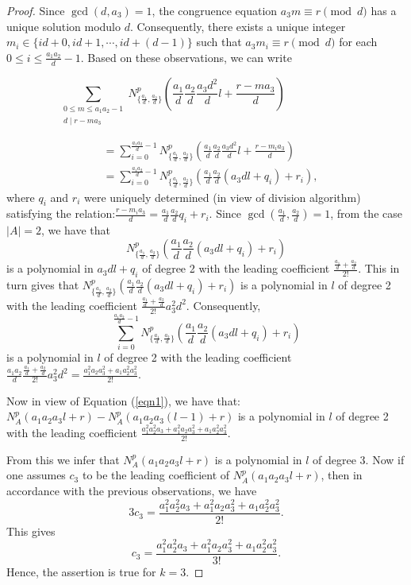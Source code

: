 \documentclass[10pt,a4paper]{amsart}
\begin{document}
\begin{proof}
Since $\gcd(d,a_3)=1$,  the congruence equation $a_3m\equiv r\pmod d$ has a unique solution modulo $d$. Consequently, there exists a unique integer   $m_i\in\{id+0,id+1,\cdots ,id+(d-1)\}$ such that $a_3m_i\equiv r\pmod d$ for each $0\leq i\leq\frac{a_1a_2}{d}-1$. Based on these observations, we can write

\[
\sum_{\substack{0\leq m\leq a_1a_2-1\\ d\mid r-ma_3}}N^p_{\{\frac{a_1}{d},\frac{a_2}{d}\}}\left(\frac{a_1}{d}\frac{a_2}{d}\frac{a_3d^2}{d}l+\frac{r-ma_3}{d}\right)\ \ \ \ \ \ \ \ \ \ \ \ \ \ \ \ \ \ \ \ \ \ \ \ \ \ \ \ 
\]


\begin{align*}
&=\sum_{i=0}^{\frac{a_1a_2}{d}-1}N^p_{\{\frac{a_1}{d},\frac{a_2}{d}\}}\left(\frac{a_1}{d}\frac{a_2}{d}\frac{a_3d^2}{d}l+\frac{r-m_ia_3}{d}\right)\\
&=\sum_{i=0}^{\frac{a_1a_2}{d}-1}N^p_{\{\frac{a_1}{d},\frac{a_2}{d}\}}\left(\frac{a_1}{d}\frac{a_2}{d}\left(a_3dl+q_i\right)+r_i\right),
\end{align*}
where $q_i$ and $r_i$ were uniquely determined (in view of division algorithm) satisfying the relation:$\frac{r-m_ia_3}{d}=\frac{a_1}{d}\frac{a_2}{d}q_i+r_i$. Since $\gcd(\frac{a_1}{d},\frac{a_2}{d})=1$, from the case $|A|=2$, we have that \[N^p_{\{\frac{a_1}{d},\frac{a_2}{d}\}}\left(\frac{a_1}{d}\frac{a_2}{d}\left(a_3dl+q_i\right)+r_i\right)\] is a polynomial in $a_3dl+q_i$ of degree 2 with the leading coefficient $\frac{\frac{a_1}{d}+\frac{a_2}{d}}{2!}$. This in turn gives that $N^p_{\{\frac{a_1}{d},\frac{a_2}{d}\}}\left(\frac{a_1}{d}\frac{a_2}{d}\left(a_3dl+q_i\right)+r_i\right)$ is a polynomial in $l$ of degree 2 with the leading coefficient $\frac{\frac{a_1}{d}+\frac{a_2}{d}}{2!}a_3^2d^2$. Consequently, \[\sum_{i=0}^{\frac{a_1a_2}{d}-1}N^p_{\{\frac{a_1}{d},\frac{a_2}{d}\}}\left(\frac{a_1}{d}\frac{a_2}{d}\left(a_3dl+q_i\right)+r_i\right)\] is a polynomial in $l$ of degree 2 with the leading coefficient 
$
\frac{a_1a_2}{d}\frac{\frac{a_1}{d}+\frac{a_2}{d}}{2!}a_3^2d^2
=\frac{a_1^2a_2a_3^2+a_1a_2^2a_3^2}{2!}$.

Now in view of Equation (\ref{eqn1}), we have that:
$
N_A^p(a_1a_2a_3l+r)-N_A^p(a_1a_2a_3(l-1)+r)
$ is a polynomial in $l$ of degree 2 with the leading coefficient $\frac{a_1^2a_2^2a_3+a_1^2a_2a_3^2+a_1a_2^2a_3^2}{2!}$.

From this we infer that $N_A^p(a_1a_2a_3l+r)$ is a polynomial in $l$ of degree 3. Now if one assumes $c_3$ to be the leading coefficient of $N_A^p(a_1a_2a_3l+r)$, then in accordance with the previous observations, we have
\[
3c_3=\frac{a_1^2a_2^2a_3+a_1^2a_2a_3^2+a_1a_2^2a_3^2}{2!}.
\]
This gives 
\[c_3=\frac{a_1^2a_2^2a_3+a_1^2a_2a_3^2+a_1a_2^2a_3^2}{3!}.
\]
Hence, the assertion is true for $k=3$. 


\end{proof}
\end{document}
